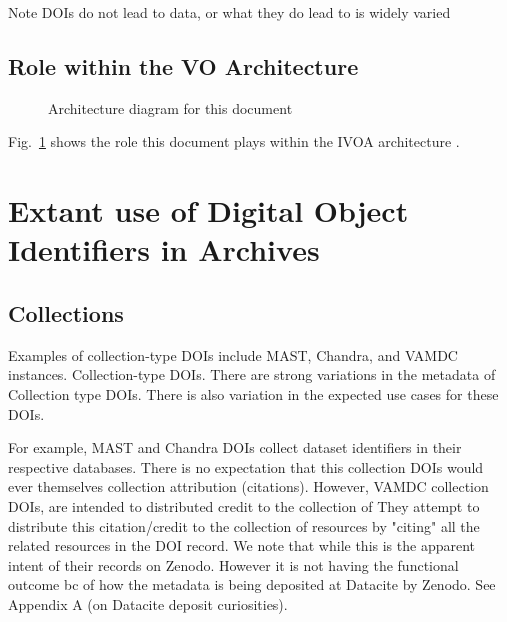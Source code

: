 \documentclass[11pt,a4paper]{ivoa}
\begin{document}
\begin{admonition}{Note}
DOIs do not lead to data, or what they do lead to is widely varied
\end{admonition}

\subsection{Role within the VO Architecture}

\begin{figure}
\centering


\caption{Architecture diagram for this document}
\label{fig:archdiag}
\end{figure}

Fig.~\ref{fig:archdiag} shows the role this document plays within the
IVOA architecture \citep{2021ivoa.spec.1101D}.


\section{Extant use of Digital Object Identifiers in Archives}

\subsection{Collections}
Examples of collection-type DOIs include MAST, Chandra, and VAMDC instances. 
Collection-type DOIs. 
There are strong variations in the metadata of Collection type DOIs.
There is also variation in the expected use cases for these DOIs. 

For example, MAST and Chandra DOIs collect dataset identifiers in their respective databases.
There is no expectation that this collection DOIs would ever themselves collection attribution (citations).
However, VAMDC collection DOIs, are intended to distributed credit to the collection of 
They attempt to distribute this citation/credit to the collection of resources by "citing" all the related resources in the DOI record.
We note that while this is the apparent intent of their records on Zenodo.
However it is not having the functional outcome bc of how the metadata is being deposited at Datacite by Zenodo. 
See Appendix A (on Datacite deposit curiosities).
\end{document}
